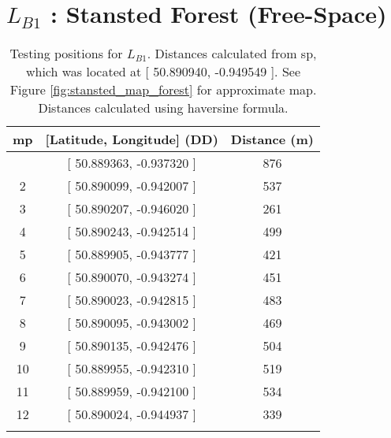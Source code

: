\section{$L_{B1}$ : Stansted Forest (Free-Space)}\label{sec:stansted_free_test_pos}

\begin{table}[H]
\centering
\caption[Testing positions for $L_{B1}$]{Testing positions for $L_{B1}$. Distances calculated from \ac{sp}, which was located at [ 50.890940, -0.949549 ]. See Figure \ref{fig:stansted_map_forest} for approximate map. Distances calculated using haversine formula.}
\begin{tabular}{ccc}
    \toprule
\textbf{\ac{mp}} & \textbf{[Latitude, Longitude]} (DD) & \textbf{Distance} (m)\\
    \midrule\addlinespace
1 & [ 50.889363, -0.937320 ] & 876 \\
2 & [ 50.890099, -0.942007 ] & 537 \\
3 & [ 50.890207, -0.946020 ] & 261 \\
4 & [ 50.890243, -0.942514 ] & 499 \\
5 & [ 50.889905, -0.943777 ] & 421 \\
6 & [ 50.890070, -0.943274 ] & 451 \\
7 & [ 50.890023, -0.942815 ] & 483 \\
8 & [ 50.890095, -0.943002 ] & 469 \\
9 & [ 50.890135, -0.942476 ] & 504 \\
10 & [ 50.889955, -0.942310 ] & 519 \\
11 & [ 50.889959, -0.942100 ] & 534 \\
12 & [ 50.890024, -0.944937 ] & 339 \\
    \addlinespace\bottomrule
\end{tabular}
\end{table}

